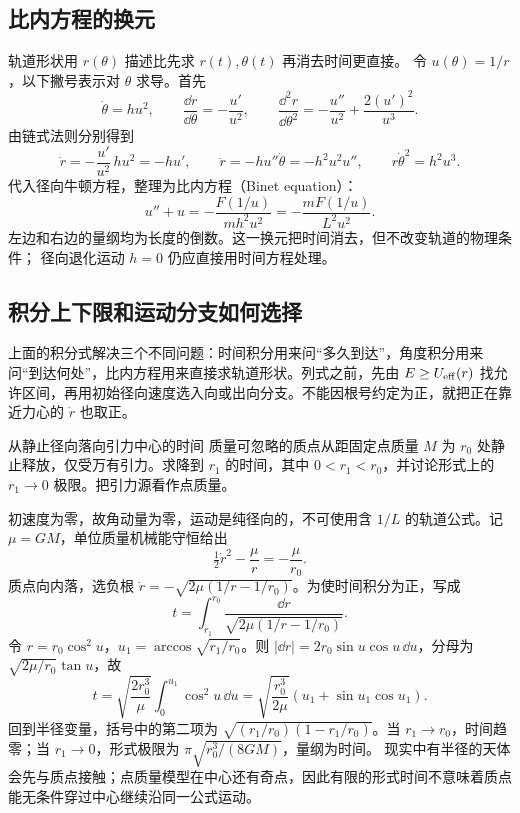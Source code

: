 \subsection{比内方程的换元}
轨道形状用 $r(\theta)$ 描述比先求 $r(t),\theta(t)$ 再消去时间更直接。
令 $u(\theta)=1/r$，以下撇号表示对 $\theta$ 求导。首先
\[
 \dot\theta=hu^2,\qquad
 \frac{\dd r}{\dd\theta}=-\frac{u'}{u^2},\qquad
 \frac{\dd^2r}{\dd\theta^2}=-\frac{u''}{u^2}+\frac{2(u')^2}{u^3}.
\]
由链式法则分别得到
\[
 \dot r=-\frac{u'}{u^2}\,hu^2=-hu',\qquad
 \ddot r=-hu''\dot\theta=-h^2u^2u'',\qquad
 r\dot\theta^2=h^2u^3.
\]
代入径向牛顿方程，整理为比内方程（Binet equation）：
\begin{equation}\label{ch11:eq:binet}
 u''+u=-\frac{F(1/u)}{mh^2u^2}
       =-\frac{mF(1/u)}{L^2u^2}.
\end{equation}
左边和右边的量纲均为长度的倒数。这一换元把时间消去，但不改变轨道的物理条件；
径向退化运动 $h=0$ 仍应直接用时间方程处理。

\subsection{积分上下限和运动分支如何选择}
上面的积分式解决三个不同问题：时间积分用来问“多久到达”，角度积分用来问“到达何处”，比内方程用来直接求轨道形状。列式之前，先由 $E\ge U_{\rm eff}(r)$ 找允许区间，再用初始径向速度选入向或出向分支。不能因根号约定为正，就把正在靠近力心的 $\dot r$ 也取正。

\begin{origexamplebox}{从静止径向落向引力中心的时间}\label{ch11:ex:teaching-radial-fall}
质量可忽略的质点从距固定点质量 $M$ 为 $r_0$ 处静止释放，仅受万有引力。求降到 $r_1$ 的时间，其中 $0<r_1<r_0$，并讨论形式上的 $r_1\to0$ 极限。把引力源看作点质量。

\ThQRadialFall
\end{origexamplebox}
\begin{xesolution}
\ThARadialFall

初速度为零，故角动量为零，运动是纯径向的，不可使用含 $1/L$ 的轨道公式。记 $\mu=GM$，单位质量机械能守恒给出
\[
 \tfrac12\dot r^2-\frac\mu r=-\frac\mu{r_0}.
\]
质点向内落，选负根 $\dot r=-\sqrt{2\mu(1/r-1/r_0)}$。为使时间积分为正，写成
\[
 t=\int_{r_1}^{r_0}\frac{\dd r}{\sqrt{2\mu(1/r-1/r_0)}}.
\]
令 $r=r_0\cos^2u$，$u_1=\arccos\sqrt{r_1/r_0}$。则 $|\dd r|=2r_0\sin u\cos u\,\dd u$，分母为 $\sqrt{2\mu/r_0}\tan u$，故
\[
 t=\sqrt{\frac{2r_0^3}{\mu}}\int_0^{u_1}\cos^2u\,\dd u
 =\sqrt{\frac{r_0^3}{2\mu}}\left(u_1+\sin u_1\cos u_1\right).
\]
回到半径变量，括号中的第二项为 $\sqrt{(r_1/r_0)(1-r_1/r_0)}$。当 $r_1\to r_0$，时间趋零；当 $r_1\to0$，形式极限为 $\pi\sqrt{r_0^3/(8GM)}$，量纲为时间。
现实中有半径的天体会先与质点接触；点质量模型在中心还有奇点，因此有限的形式时间不意味着质点能无条件穿过中心继续沿同一公式运动。
\end{xesolution}

